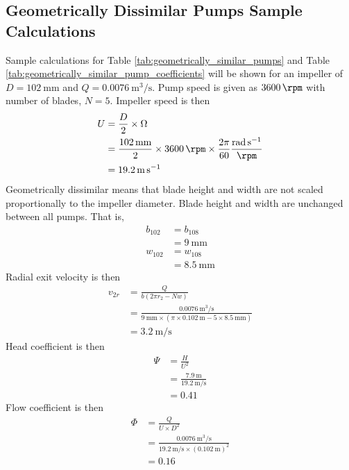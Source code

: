 \subsection{Geometrically Dissimilar Pumps Sample Calculations}
Sample calculations for Table \ref{tab:geometrically_similar_pumps} and Table \ref{tab:geometrically_similar_pump_coefficients} will be shown for an impeller of $D = \qty{102}{\milli\meter}$ and $Q = \qty{0.0076}{\meter\cubed\per\second}$. Pump speed is given as $\qty{3600}{\rpm}$ with number of blades, $N = 5$. Impeller speed is then
\begin{align*}
    U &= \frac{D}{2} \times \Omega \\
    &= \frac{\qty{102}{\milli\meter}}{2} \times \qty{3600}{\rpm} \times \frac{2\pi}{60} \frac{\unit{\radian\per\second}}{\unit{\rpm}} \\
    &= \qty{19.2}{\meter\per\second}
\end{align*}
Geometrically dissimilar means that blade height and width are not scaled proportionally to the impeller diameter. Blade height and width are unchanged between all pumps. That is,
\begin{align*}
    b_{102} &= b_{108}  \\
    &= \qty{9}{\milli\meter} \\
    w_{102} &= w_{108}  \\
    &= \qty{8.5}{\milli\meter}
\end{align*}
Radial exit velocity is then
\begin{align*}
    v_{2r} &= \frac{Q}{b(2\pi r_2 - Nw)} \\
    &= \frac{\qty{0.0076}{\meter\cubed\per\second}}{\qty{9}{\milli\meter} \times (\pi \times \qty{0.102}{\meter} - 5 \times \qty{8.5}{\milli\meter})} \\
    &= \qty{3.2}{\meter\per\second}
\end{align*}
Head coefficient is then
\begin{align*}
    \Psi &= \frac{H}{U^2} \\
    &= \frac{\qty{7.9}{\meter}}{\qty{19.2}{\meter\per\second}} \\
    &= 0.41
\end{align*}
Flow coefficient is then
\begin{align*}
    \Phi &= \frac{Q}{U \times D^2} \\
    &= \frac{\qty{0.0076}{\meter\cubed\per\second}}{\qty{19.2}{\meter\per\second} \times (\qty{0.102}{\meter})^2} \\
    &= 0.16
\end{align*}
